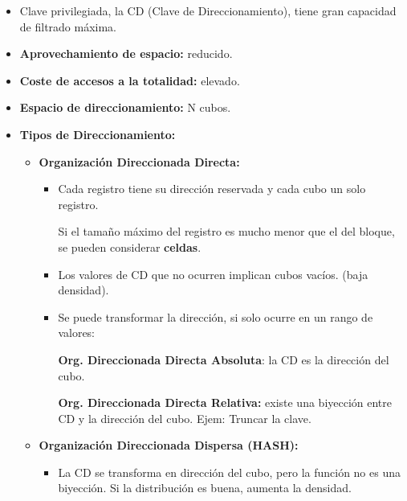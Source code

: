\documentclass[12pt, twoside, openright]{report} %
\begin{document}
\begin{itemize}
\begin{itemize}
    \item Clave privilegiada, la CD (Clave de Direccionamiento), tiene gran
      capacidad de filtrado máxima.
      
    \item \textbf{Aprovechamiento de espacio:} reducido.
      
    \item \textbf{Coste de accesos a la totalidad:} elevado.
      
    \item \textbf{Espacio de direccionamiento:} N cubos.
      
    \item \textbf{Tipos de Direccionamiento:}
      

      \begin{itemize}
      \item \textbf{Organización Direccionada Directa:}
        

        \begin{itemize}
        \item Cada registro tiene su dirección reservada y cada cubo un solo
          registro.
          

          
		  
            Si el tamaño máximo del registro es mucho menor que el del
            bloque, se pueden considerar \textbf{celdas}.
           
			
        \item Los valores de CD que no ocurren implican cubos vacíos. (baja
          densidad).
          
        \item Se puede transformar la dirección, si solo ocurre en un rango
          de valores:
          

         
		  
            \textbf{Org. Direccionada Directa Absoluta}: la CD es la
            dirección del cubo.
           
			
            \textbf{Org. Direccionada Directa Relativa:} existe una
            biyección entre CD y la dirección del cubo. Ejem: Truncar la
            clave.
       
			
        \end{itemize}
		\pagebreak
      \item \textbf{Organización Direccionada Dispersa (HASH):}
        

        \begin{itemize}
        \item La CD se transforma en dirección del cubo, pero la función no
          es una biyección. Si la distribución es buena, aumenta la
          densidad.
          

\end{itemize}
\end{itemize}
\end{itemize}
\end{itemize}
\end{document}
